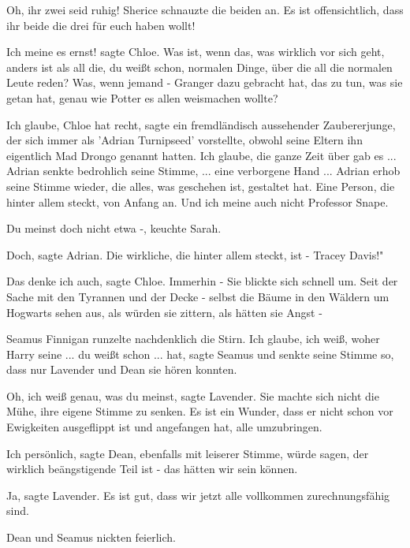 \glqq Oh, ihr zwei seid ruhig!\grqq{} Sherice schnauzte die beiden an. \glqq Es
ist offensichtlich, dass ihr beide die drei für euch haben wollt!\grqq{}

\glqq Ich meine es ernst!\grqq{} sagte Chloe. \glqq Was ist, wenn das, was
wirklich vor sich geht, anders ist als all die, du weißt schon, normalen Dinge,
über die all die normalen Leute reden? Was, wenn jemand - Granger dazu gebracht
hat, das zu tun, was sie getan hat, genau wie Potter es allen weismachen
wollte?\grqq{}

\glqq Ich glaube, Chloe hat recht\grqq{}, sagte ein fremdländisch aussehender
Zaubererjunge, der sich immer als 'Adrian Turnipseed' vorstellte, obwohl seine
Eltern ihn eigentlich Mad Drongo genannt hatten. \glqq Ich glaube, die ganze
Zeit über gab es ...\grqq{} Adrian senkte bedrohlich seine Stimme, \glqq ...
eine verborgene Hand ...\grqq{} Adrian erhob seine Stimme wieder, \glqq die
alles, was geschehen ist, gestaltet hat. Eine Person, die hinter allem steckt,
von Anfang an. Und ich meine auch nicht Professor Snape.\grqq{}

\glqq Du meinst doch nicht etwa -\grqq{}, keuchte Sarah.

\glqq Doch\grqq{}, sagte Adrian. \glqq Die wirkliche, die hinter allem steckt,
ist - Tracey Davis!"

\glqq Das denke ich auch\grqq{}, sagte Chloe. \glqq Immerhin -\grqq{} Sie
blickte sich schnell um. \glqq Seit der Sache mit den Tyrannen und der Decke -
selbst die Bäume in den Wäldern um Hogwarts sehen aus, als würden sie zittern,
als hätten sie Angst -\grqq{}

Seamus Finnigan runzelte nachdenklich die Stirn. \glqq Ich glaube, ich weiß,
woher Harry seine ... du weißt schon ... hat\grqq{}, sagte Seamus und senkte
seine Stimme so, dass nur Lavender und Dean sie hören konnten.

\glqq Oh, ich weiß genau, was du meinst\grqq{}, sagte Lavender. Sie machte sich
nicht die Mühe, ihre eigene Stimme zu senken. \glqq Es ist ein Wunder, dass er
nicht schon vor Ewigkeiten ausgeflippt ist und angefangen hat, alle
umzubringen.\grqq{}

\glqq Ich persönlich\grqq{}, sagte Dean, ebenfalls mit leiserer Stimme, \glqq
würde sagen, der wirklich beängstigende Teil ist - das hätten wir sein
können.\grqq{}

\glqq Ja\grqq{}, sagte Lavender. \glqq Es ist gut, dass wir jetzt alle
vollkommen zurechnungsfähig sind.\grqq{}

Dean und Seamus nickten feierlich.

